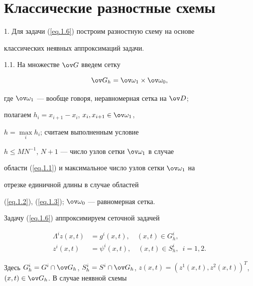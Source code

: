 \section{Классические разностные схемы}


\label{section.5}





1. Для задачи (\ref{eq.1.6}) построим разностную схему на основе


классических неявных аппроксимаций задачи.





1.1. На множестве $\ov G$ введем сетку


\begin{equation}


\label{eq.5.1}


\ov G_h=\ov\omega_1\times \ov\omega_0,


\end{equation}


где $\ov\omega_1$ --- вообще говоря, неравномерная сетка на $\ov D$;


полагаем $h_i=x_{i+1}-x_i$, $x_i,x_{i+1}\in \ov\omega_1$,


$h=\max\limits_i h_i$; считаем выполненным условие


$h\le M N^{-1}$, $N+1$ --- число узлов сетки $\ov\omega_1$ в случае


области (\ref{eq.1.1}) и максимальное число узлов сетки $\ov\omega_1$ на


отрезке единичной длины в случае областей


(\ref{eq.1.2}), (\ref{eq.1.3}); $\ov\omega_0$ --- равномерная сетка.


Задачу (\ref{eq.1.6}) аппроксимируем сеточной задачей


\begin{equation}


\label{eq.5.2}


\begin{split}


\Lambda^i z(x, t)&=g^i(x, t), \quad (x, t)\in G^i_h,\\


z^i(x, t)&=\psi^i(x, t), \quad (x, t)\in S^i_h, \ \; i=1, 2.


\end{split}


\end{equation}


Здесь $G^i_h=G^i\cap \ov G_h$, $S^i_h=S^i\cap \ov G_h$, $z(x, t)={(z^1(x,


t), z^2(x, t))}^T$, $(x, t)\in \ov G_h$. В случае неявной схемы


